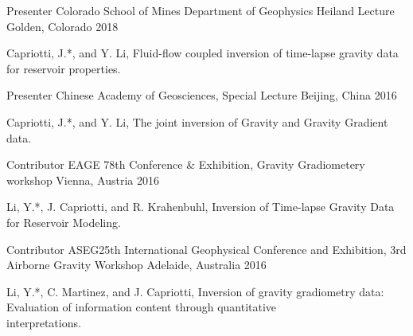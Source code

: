 

\begin{cventries}\cventry
    {Presenter} %
    {Colorado School of Mines Department of Geophysics Heiland Lecture} %
    {Golden, Colorado} %
    {2018} %
    {
      \begin{cvitems} %
        \item {Capriotti, J.*, and Y. Li, Fluid-flow coupled inversion of time-lapse gravity data for reservoir properties.}
      \end{cvitems}
    }
  \cventry
    {Presenter} %
    {Chinese Academy of Geosciences, Special Lecture} %
    {Beijing, China} %
    {2016} %
    {
      \begin{cvitems} %
        \item {Capriotti, J.*, and Y. Li, The joint inversion of Gravity and Gravity Gradient data.}
      \end{cvitems}
    }

  \cventry
    {Contributor} %
    {EAGE 78th Conference \& Exhibition, Gravity Gradiometery workshop} %
    {Vienna, Austria} %
    {2016} %
    {
      \begin{cvitems} %
        \item {Li, Y.*, J. Capriotti, and R. Krahenbuhl, Inversion of Time-lapse Gravity Data for Reservoir Modeling.}
      \end{cvitems}
    }
    
  \cventry
    {Contributor} %
    {ASEG25th International Geophysical Conference and Exhibition, 3rd Airborne Gravity Workshop} %
    {Adelaide, Australia} %
    {2016} %
    {
      \begin{cvitems} %
        \item {Li, Y.*, C. Martinez, and J. Capriotti, Inversion of gravity gradiometry data: Evaluation of information content through quantitative \\ interpretations.}
      \end{cvitems}
    }


\end{cventries}
